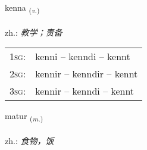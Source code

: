 \documentclass[frontgrid, backgrid]{flacards}\usepackage[]{graphicx}\usepackage[]{xcolor}
\begin{document}
\renewcommand{\flhead}{\vskip5pt \fboxsep=0pt {\small\bfseries\footnotesize Sagnorð | 动词}}
\renewcommand{\fcfoot}{\vskip5pt \fboxsep=0pt \hspace{2pt}{\small\bfseries\footnotesize 1K}}

\renewcommand{\blhead}{\vskip5pt {\small\bfseries\footnotesize Sagnorð | 动词 }}
\renewcommand{\bcfoot}{\vskip5pt \hspace{2pt}{\small\bfseries\footnotesize 1K}}


{kenna \small{\textsubscript{(\textit{v.})}} \\[1ex] %
\textphonetic{[cʰɛna]} \\
zh.: \emph{教学；责备} \\  [2ex]
\renewcommand*{\arraystretch}{0.8}
\begin{tabular}{p{1cm}l}
\textsc{1sg}: & kenni -- kenndi -- kennt \\ 
\textsc{2sg}: & kennir -- kenndir -- kennt \\ 
\textsc{3sg}: & kennir -- kenndi -- kennt \\ 
\end{tabular}
}

\renewcommand{\flhead}{\vskip5pt \fboxsep=0pt {\small\bfseries\footnotesize Nafnorð | 名词}}
\renewcommand{\fcfoot}{\vskip5pt \fboxsep=0pt \hspace{2pt}{\small\bfseries\footnotesize 1K}}

\renewcommand{\blhead}{\vskip5pt {\small\bfseries\footnotesize Nafnorð | 名词 }}
\renewcommand{\bcfoot}{\vskip5pt \hspace{2pt}{\small\bfseries\footnotesize 1K}}


{matur \small{\textsubscript{(\textit{m.})}} \\[1ex] %
\textphonetic{[maːtʏr]} \\
zh.: \emph{食物，饭} \\  [2ex]
\renewcommand*{\arraystretch}{0.8}
}
\end{document}
